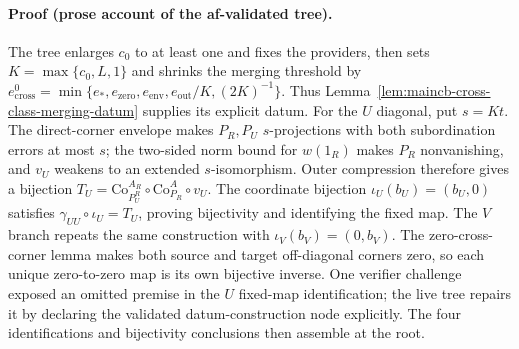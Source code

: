 \paragraph{Proof (prose account of the af-validated tree).}
The tree enlarges $c_0$ to at least one and fixes the providers, then sets
$K=\max\{c_0,L,1\}$ and shrinks the merging threshold by
$e^0_{\mathrm{cross}}=\min\{e_*,e_{\mathrm{zero}},e_{\mathrm{env}},e_{\mathrm{out}}/K,(2K)^{-1}\}$.
Thus Lemma~\ref{lem:maincb-cross-class-merging-datum} supplies its explicit datum.
For the $U$ diagonal, put $s=Kt$.  The direct-corner envelope makes $P_R,P_U$
$s$-projections with both subordination errors at most $s$; the two-sided norm
bound for $w(1_R)$ makes $P_R$ nonvanishing, and $v_U$ weakens to an extended
$s$-isomorphism.  Outer compression therefore gives a bijection
$T_U=\mathrm{Co}^{A_R}_{P_U^R}\circ\mathrm{Co}^{A}_{P_R}\circ v_U$.
The coordinate bijection $\iota_U(b_U)=(b_U,0)$ satisfies
$\gamma_{UU}\circ\iota_U=T_U$, proving bijectivity and identifying the fixed map.
The $V$ branch repeats the same construction with $\iota_V(b_V)=(0,b_V)$.
The zero-cross-corner lemma makes both source and target off-diagonal corners zero,
so each unique zero-to-zero map is its own bijective inverse.
One verifier challenge exposed an omitted premise in the $U$ fixed-map identification;
the live tree repairs it by declaring the validated datum-construction node explicitly.
The four identifications and bijectivity conclusions then assemble at the root.

